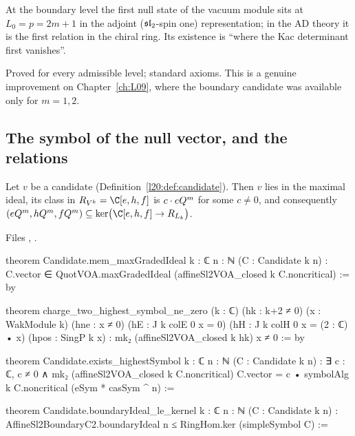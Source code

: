 \begin{physics}
At the boundary level the first null state of the vacuum module sits at $L_0=p=2m+1$ in the adjoint
($\mathfrak{sl}_2$-spin one) representation; in the AD theory it is the first relation in the chiral ring. Its
existence is ``where the Kac determinant first vanishes''.
\end{physics}

\begin{status}
Proved for every admissible level; standard axioms. This is a genuine improvement on Chapter~\ref{ch:L09},
where the boundary candidate was available only for $m=1,2$.
\end{status}

\subsection{The symbol of the null vector, and the relations}

\begin{theorem}\label{l20:thm:symbol}
Let $v$ be a candidate (Definition~\ref{l20:def:candidate}). Then $v$ lies in the maximal ideal, its class in
$R_{V^k}=\C[e,h,f]$ is $c\cdot eQ^m$ for some $c\neq0$, and consequently
$(e\ltwentyQ^m,h\ltwentyQ^m,f\ltwentyQ^m)\subseteq\ker\bigl(\C[e,h,f]\to R_{L_k}\bigr)$.
\end{theorem}
\noindent Files ,
.
\begin{leancode}
theorem Candidate.mem_maxGradedIdeal {k : ℂ} {n : ℕ} (C : Candidate k n) :
    C.vector ∈ QuotVOA.maxGradedIdeal (affineSl2VOA_closed k C.noncritical) := by

theorem charge_two_highest_symbol_ne_zero (k : ℂ) (hk : k+2 ≠ 0)
    (x : WakModule k) (hne : x ≠ 0)
    (hE : J k colE 0 x = 0) (hH : J k colH 0 x = (2 : ℂ) • x)
    (hpos : SingP k x) :
    mk₂ (affineSl2VOA_closed k hk) x ≠ 0 := by

theorem Candidate.exists_highestSymbol {k : ℂ} {n : ℕ} (C : Candidate k n) :
    ∃ c : ℂ, c ≠ 0 ∧ mk₂ (affineSl2VOA_closed k C.noncritical) C.vector =
      c • symbolAlg k C.noncritical
        (eSym * casSym ^ n) :=

theorem Candidate.boundaryIdeal_le_kernel {k : ℂ} {n : ℕ} (C : Candidate k n) :
    AffineSl2BoundaryC2.boundaryIdeal n ≤
      RingHom.ker (simpleSymbol C) :=
\end{leancode}

